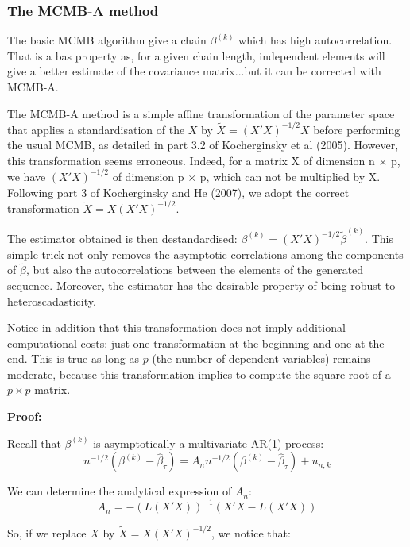\documentclass[11pt]{article}
\begin{document}
	\subsubsection{The MCMB-A method}

The basic MCMB algorithm give a chain $\beta^{(k)}$ which has high autocorrelation. That is a bas property as, for a given chain length, independent elements will give a better estimate of the covariance matrix...but it can be corrected with MCMB-A.\medskip

The MCMB-A method is a simple affine transformation of the parameter space that applies a standardisation of the $X$ by $\tilde{X}=(X'X)^{-1/2}X$ before performing the usual MCMB, as detailed in part 3.2 of Kocherginsky et al (2005). However, this transformation seems erroneous. Indeed, for a matrix X of dimension n $\times$ p, we have $(X'X)^{-1/2}$ of dimension p $\times$ p, which can not be multiplied by X. Following part 3 of Kocherginsky and He (2007), we adopt the correct transformation $\tilde{X}=X(X'X)^{-1/2}$.\smallskip

The estimator obtained is then destandardised: $\beta^{(k)}=(X'X)^{-1/2}\tilde{\beta}^{(k)}$. This simple trick not only removes the asymptotic correlations among the components of $\tilde{\beta}$, but also the autocorrelations between the elements of the generated sequence. Moreover, the estimator has the desirable property of being robust to heteroscadasticity.\smallskip

Notice in addition that this transformation does not imply additional computational costs: just one transformation at the beginning and one at the end. This is true as long as $p$ (the number of dependent variables) remains moderate, because this transformation implies to compute the square root of a $p\times p$ matrix.\medskip


\textbf{Proof:}

Recall that $\beta^{(k)}$ is asymptotically a multivariate AR(1) process:
\begin{equation}
n^{-1/2}(\beta^{(k)}-\hat{\beta}_{\tau}) = A_{n}n^{-1/2}(\beta^{(k)}-\hat{\beta}_{\tau}) + u_{n,k}
\end{equation}

We can determine the analytical expression of $A_{n}$:
\begin{equation}
A_{n} = -\left(L(X'X)\right)^{-1}\left(X'X-L(X'X)\right)
\end{equation}

So, if we replace $X$ by $\tilde{X} = X(X'X)^{-1/2}$, we notice that:
\end{document}
